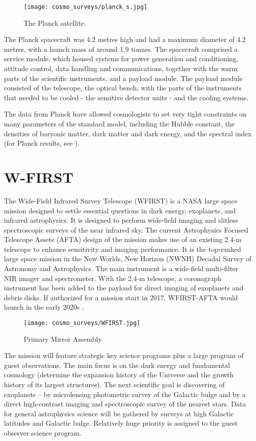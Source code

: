\begin{figure}[ht]
    \centering
    \texttt{[image: cosmo\_surveys/planck\_s.jpg]}
    \caption{The Planck satellite.}
    \label{fig:planck}
\end{figure}
The Planck spacecraft was 4.2 metres high and had a maximum diameter of 4.2 metres, with a launch mass of around 1.9 tonnes. The spacecraft comprised a service module, which housed systems for power generation and conditioning, attitude control, data handling and communications, together with the warm parts of the scientific instruments, and a payload module. The payload module consisted of the telescope, the optical bench, with the parts of the instruments that needed to be cooled - the sensitive detector units - and the cooling systems.

The data from Planck have allowed cosmologists to set very tight constraints on many parameters of the standard model, including the Hubble constant, the densities of baryonic matter, dark matter and dark energy, and the spectral index (for Planck results, see \cite{planck_cosm}).

\section{W-FIRST}
The Wide-Field Infrared Survey Telescope (WFIRST) is a NASA large space mission designed to settle essential questions in dark energy, exoplanets, and infrared astrophysics. It is designed to perform wide-field imaging and slitless spectroscopic surveys of the near infrared sky. The current Astrophysics Focused Telescope Assets (AFTA) design of the mission makes use of an existing 2.4-m telescope to enhance sensitivity and imaging performance. It is the top-ranked large space mission in the New Worlds, New Horizon (NWNH) Decadal Survey of Astronomy and Astrophysics. The main instrument is a wide-field multi-filter NIR imager and spectrometer. With the 2.4-m telescope, a coronagraph instrument has been added to the payload for direct imaging of exoplanets and debris disks. If authorized for a mission start in 2017, WFIRST-AFTA would launch in the early 2020s \cite{WFIRST_report}.

\begin{figure}[ht]
    \centering
    \texttt{[image: cosmo\_surveys/WFIRST.jpg]}
    \caption{Primary Mirror Assembly.}
    \label{fig:wfirst}
\end{figure}
The mission will feature strategic key science programs plus a large program of guest observations. The main focus is on the dark energy and fundamental cosmology (determine the expansion history of the Universe and the growth history of its largest structures). The next scientific goal is discovering of exoplanets -- by microlensing photometric survey of the Galactic bulge and by a direct high-contrast imaging and spectroscopic survey of the nearest stars. Data for general astrophysics science will be gathered by surveys at high Galactic latitudes and Galactic bulge. Relatively huge priority is assigned to the guest observer science program.

